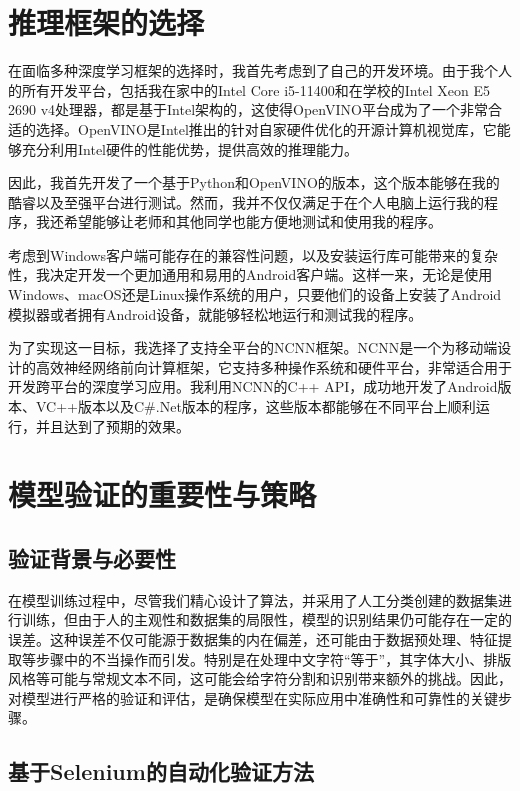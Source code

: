 \section{推理框架的选择}

在面临多种深度学习框架的选择时，我首先考虑到了自己的开发环境。由于我个人的所有开发平台，包括我在家中的Intel Core i5-11400和在学校的Intel Xeon E5 2690 v4处理器，都是基于Intel架构的，这使得OpenVINO平台成为了一个非常合适的选择。OpenVINO是Intel推出的针对自家硬件优化的开源计算机视觉库，它能够充分利用Intel硬件的性能优势，提供高效的推理能力。

因此，我首先开发了一个基于Python和OpenVINO的版本，这个版本能够在我的酷睿以及至强平台进行测试。然而，我并不仅仅满足于在个人电脑上运行我的程序，我还希望能够让老师和其他同学也能方便地测试和使用我的程序。

考虑到Windows客户端可能存在的兼容性问题，以及安装运行库可能带来的复杂性，我决定开发一个更加通用和易用的Android客户端。这样一来，无论是使用Windows、macOS还是Linux操作系统的用户，只要他们的设备上安装了Android模拟器或者拥有Android设备，就能够轻松地运行和测试我的程序。

为了实现这一目标，我选择了支持全平台的NCNN框架。NCNN是一个为移动端设计的高效神经网络前向计算框架，它支持多种操作系统和硬件平台，非常适合用于开发跨平台的深度学习应用。我利用NCNN的C++ API，成功地开发了Android版本、VC++版本以及C\#.Net版本的程序，这些版本都能够在不同平台上顺利运行，并且达到了预期的效果。

\section{模型验证的重要性与策略}

\subsection{验证背景与必要性}

在模型训练过程中，尽管我们精心设计了算法，并采用了人工分类创建的数据集进行训练，但由于人的主观性和数据集的局限性，模型的识别结果仍可能存在一定的误差。这种误差不仅可能源于数据集的内在偏差，还可能由于数据预处理、特征提取等步骤中的不当操作而引发。特别是在处理中文字符“等于”，其字体大小、排版风格等可能与常规文本不同，这可能会给字符分割和识别带来额外的挑战。因此，对模型进行严格的验证和评估，是确保模型在实际应用中准确性和可靠性的关键步骤。

\subsection{基于Selenium的自动化验证方法}


